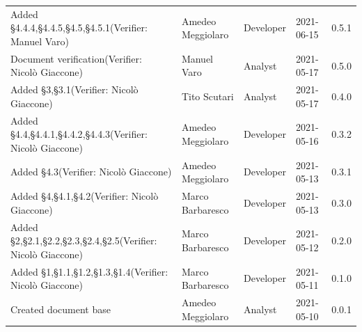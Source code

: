 \documentclass[a4paper]{article}
\begin{document}
\begin{center}
\begin{table}[h!]
\begin{tabular}{p{150px} p{90px} p{80px} p{60px} p{45px}}
            Added \S{4.4.4},\S{4.4.5},\S{4.5},\S{4.5.1}\newline(Verifier: Manuel Varo)             & Amedeo Meggiolaro & Developer     & 2021-06-15    & 0.5.1            \\
            Document verification\newline(Verifier: Nicolò Giaccone)                               & Manuel Varo       & Analyst       & 2021-05-17    & 0.5.0            \\
            Added \S{3},\S{3.1}\newline(Verifier: Nicolò Giaccone)                                 & Tito Scutari      & Analyst       & 2021-05-17    & 0.4.0            \\
            Added \S{4.4},\S{4.4.1},\S{4.4.2},\S{4.4.3}\newline(Verifier: Nicolò Giaccone)         & Amedeo Meggiolaro & Developer     & 2021-05-16    & 0.3.2            \\
            Added \S{4.3}\newline(Verifier: Nicolò Giaccone)                                       & Amedeo Meggiolaro & Developer     & 2021-05-13    & 0.3.1            \\
            Added \S{4},\S{4.1},\S{4.2}\newline(Verifier: Nicolò Giaccone)                         & Marco Barbaresco  & Developer     & 2021-05-13    & 0.3.0            \\
            Added \S{2},\S{2.1},\S{2.2},\S{2.3},\S{2.4},\S{2.5}\newline(Verifier: Nicolò Giaccone) & Marco Barbaresco  & Developer     & 2021-05-12    & 0.2.0            \\
            Added \S{1},\S{1.1},\S{1.2},\S{1.3},\S{1.4}\newline(Verifier: Nicolò Giaccone)         & Marco Barbaresco  & Developer     & 2021-05-11    & 0.1.0            \\
            Created document base                                                                  & Amedeo Meggiolaro & Analyst       & 2021-05-10    & 0.0.1            \\
        \end{tabular}
    \end{table}
\end{center}

\newpage
\tableofcontents
\newpage
\newpage
\listoffigures
\newpage






\end{document}
